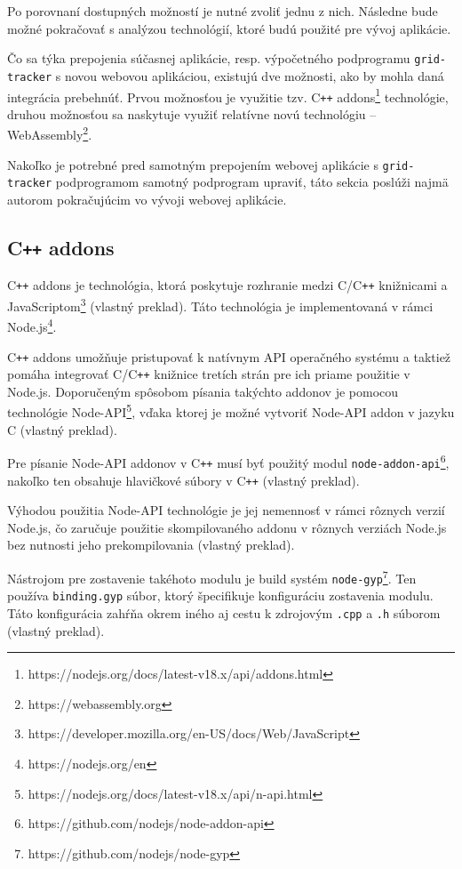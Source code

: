 Po porovnaní dostupných možností je nutné zvoliť jednu z nich. Následne bude možné pokračovať s analýzou technológií, ktoré budú použité pre vývoj aplikácie.

Čo sa týka prepojenia súčasnej aplikácie, resp. výpočetného podprogramu \texttt{grid-tracker} s novou webovou aplikáciou, existujú dve možnosti, ako by mohla daná integrácia prebehnúť. Prvou možnosťou je využitie tzv. C\texttt{++} addons\footnote{https://nodejs.org/docs/latest-v18.x/api/addons.html} technológie, druhou možnosťou sa naskytuje využiť relatívne novú technológiu -- WebAssembly\footnote{https://webassembly.org}.

Nakoľko je potrebné pred samotným prepojením webovej aplikácie s \texttt{grid-tracker} podprogramom samotný podprogram upraviť, táto sekcia poslúži najmä autorom pokračujúcim vo vývoji webovej aplikácie. 

\subsection {C\texttt{++} addons}
C\texttt{++} addons je technológia, ktorá poskytuje rozhranie medzi C/C\texttt{++} knižnicami a JavaScriptom\footnote{https://developer.mozilla.org/en-US/docs/Web/JavaScript} \cite{cpp_addons} (vlastný preklad). Táto technológia je implementovaná v rámci Node.js\footnote{https://nodejs.org/en}.

C\texttt{++} addons umožňuje pristupovať k natívnym API operačného systému a taktiež pomáha integrovať C/C\texttt{++} knižnice tretích strán pre ich priame použitie v Node.js. Doporučeným spôsobom písania takýchto addonov je pomocou technológie Node-API\footnote{https://nodejs.org/docs/latest-v18.x/api/n-api.html}, vďaka ktorej je možné vytvoriť Node-API addon v jazyku C \cite{cpp_addons} (vlastný preklad).

Pre písanie Node-API addonov v C\texttt{++} musí byť použitý modul \texttt{node-addon-api}\footnote{https://github.com/nodejs/node-addon-api}, nakoľko ten obsahuje hlavičkové súbory v C\texttt{++} \cite{cpp_addons} (vlastný preklad).

Výhodou použitia Node-API technológie je jej nemennosť v rámci rôznych verzií Node.js, čo zaručuje použitie skompilovaného addonu v rôznych verziách Node.js bez nutnosti jeho prekompilovania \cite{cpp_addons} (vlastný preklad).

Nástrojom pre zostavenie takéhoto modulu je build systém \texttt{node-gyp}\footnote{https://github.com/nodejs/node-gyp}. Ten používa \texttt{binding.gyp} súbor, ktorý špecifikuje konfiguráciu zostavenia modulu. Táto konfigurácia zahŕňa okrem iného aj cestu k zdrojovým \texttt{.cpp} a \texttt{.h} súborom  \cite{cpp_addons} (vlastný preklad).

